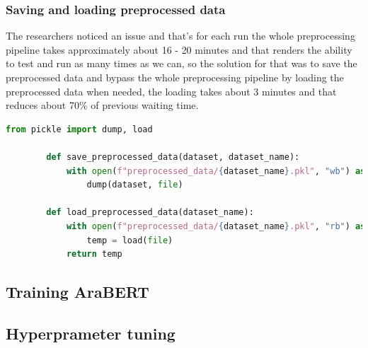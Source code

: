 \documentclass[12pt]{diazessay}
\begin{document}
        \subsubsection{Saving and loading preprocessed data}
        The researchers noticed an issue and that's for each run the whole preprocessing pipeline takes approximately about 16 - 20 minutes and that renders the ability to test and run as many times as we can, so the solution for that was to save the preprocessed data and bypass the whole preprocessing pipeline by loading the preprocessed data when needed, the loading takes about 3 minutes and that reduces about 70\% of previous waiting time. 
        \begin{lstlisting}[language=Python]
        from pickle import dump, load

        def save_preprocessed_data(dataset, dataset_name):
            with open(f"preprocessed_data/{dataset_name}.pkl", "wb") as file:
                dump(dataset, file)
        
        def load_preprocessed_data(dataset_name):
            with open(f"preprocessed_data/{dataset_name}.pkl", "rb") as file:
                temp = load(file)
            return temp
        \end{lstlisting}
    \subsection{Training AraBERT}
    \subsection{Hyperprameter tuning}


\newpage
\end{document}
